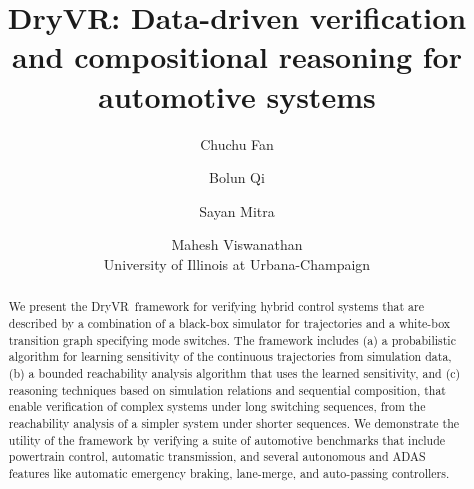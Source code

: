 \documentclass{article}
\newcommand{\toolname}{{\sc DryVR}}
\theoremstyle{plain}
\theoremstyle{definition}
\theoremstyle{example}
\begin{document}
\title{\toolname: Data-driven verification and compositional reasoning for automotive  systems}
\author{Chuchu Fan \and Bolun Qi \and Sayan Mitra \and Mahesh Viswanathan\\University of Illinois at Urbana-Champaign}
\date{}
\maketitle
\begin{abstract}
	We present the \toolname\ framework for verifying  hybrid control systems that are described by a combination of a black-box simulator for trajectories and a white-box transition graph specifying mode switches. 
	The framework  includes (a) a probabilistic algorithm for learning  sensitivity of the continuous trajectories  from simulation data, 
	(b) a bounded reachability analysis algorithm that uses the learned sensitivity, and 
	(c) reasoning techniques based on simulation relations and sequential composition, that enable verification of complex systems under long switching sequences, from the reachability analysis of a simpler system under shorter sequences. 
	 We demonstrate the utility of the framework by verifying a suite of automotive benchmarks that include powertrain control, automatic transmission, and several autonomous and ADAS features like automatic emergency braking, lane-merge, and auto-passing controllers.
\end{abstract}
%









\newpage




\newpage

\appendix

%

%
\end{document}
